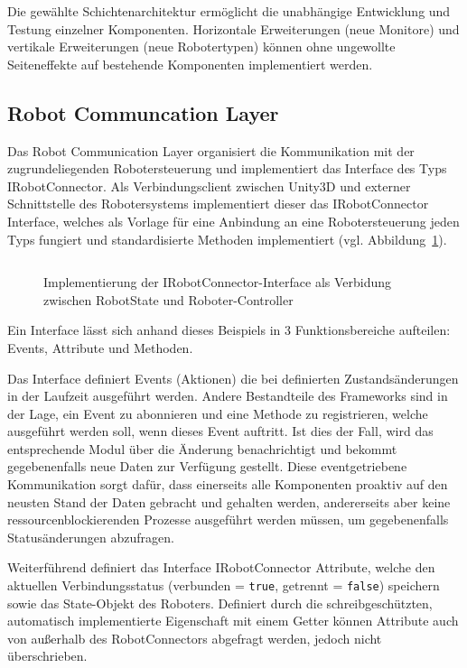 Die gewählte Schichtenarchitektur ermöglicht die unabhängige Entwicklung und
Testung einzelner Komponenten. Horizontale Erweiterungen (neue Monitore) und
vertikale Erweiterungen (neue Robotertypen) können ohne ungewollte
Seiteneffekte auf
bestehende Komponenten implementiert werden.

\subsection{Robot Communcation Layer}
Das Robot Communication Layer organisiert die Kommunikation mit der
zugrundeliegenden Robotersteuerung und
implementiert das Interface des Typs IRobotConnector. Als Verbindungsclient
zwischen Unity3D und externer Schnittstelle des Robotersystems implementiert
dieser das IRobotConnector Interface, welches als Vorlage für eine Anbindung an
eine Robotersteuerung jeden Typs fungiert und standardisierte Methoden
implementiert (vgl. Abbildung~\ref{figure:irobotconnector}).

\begin{figure}[H]
  \inputminted[fontsize=\footnotesize]{csharp}{code-snippets/IRobotConnector.cs}
  \caption{Implementierung der IRobotConnector-Interface als Verbidung zwischen
  RobotState und Roboter-Controller}
  \label{figure:irobotconnector}
\end{figure}

Ein Interface lässt sich anhand dieses Beispiels in 3
Funktionsbereiche aufteilen: Events, Attribute und Methoden.

Das Interface definiert Events (Aktionen) die bei
definierten Zustandsänderungen
in der Laufzeit ausgeführt werden. Andere Bestandteile des Frameworks
sind in der
Lage, ein Event zu abonnieren und eine Methode zu registrieren,
welche ausgeführt
werden soll, wenn dieses Event auftritt. Ist dies der Fall, wird das
entsprechende Modul über die Änderung benachrichtigt und bekommt gegebenenfalls
neue Daten zur Verfügung gestellt. Diese eventgetriebene Kommunikation sorgt
dafür, dass einerseits alle Komponenten proaktiv auf den neusten
Stand der Daten gebracht
und gehalten werden, andererseits aber keine ressourcenblockierenden Prozesse
ausgeführt werden müssen, um gegebenenfalls Statusänderungen abzufragen.

Weiterführend definiert das Interface IRobotConnector
Attribute, welche den
aktuellen Verbindungsstatus (verbunden = \texttt{true}, getrennt =
\texttt{false}) speichern sowie das
State-Objekt des Roboters. Definiert durch die schreibgeschützten, automatisch
implementierte Eigenschaft mit einem Getter können Attribute
auch von außerhalb des RobotConnectors abgefragt werden, jedoch nicht
überschrieben.

